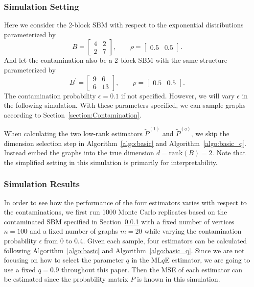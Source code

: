 \documentclass[a4paper]{article}
\begin{document}
\subsubsection{Simulation Setting}
\label{section:sim_setting}
Here we consider the 2-block SBM with respect to the exponential distributions parameterized by
\begin{equation*}
B = \begin{bmatrix}
4 & 2 \\
2 & 7
\end{bmatrix}
,\qquad \rho = \begin{bmatrix}
0.5 & 0.5
\end{bmatrix}.
\end{equation*}
And let the contamination also be a 2-block SBM with the same structure parameterized by
\begin{equation*}
B^{\prime} = \begin{bmatrix}
9 & 6 \\
6 & 13
\end{bmatrix}
,\qquad \rho = \begin{bmatrix}
0.5 & 0.5
\end{bmatrix}.
\end{equation*}
The contamination probability $\epsilon = 0.1$ if not specified. However, we will vary $\epsilon$ in the following simulation. With these parameters specified, we can sample graphs according to Section~\ref{section:Contamination}.

When calculating the two low-rank estimators $\widetilde{P}^{(1)}$ and $\widetilde{P}^{(q)}$, we skip the dimension selection step in Algorithm~\ref{algo:basic} and Algorithm~\ref{algo:basic_q}. Instead embed the graphs into the true dimension $d = \mathrm{rank}(B) = 2$.
Note that the simplified setting in this simulation is primarily for interpretability.



\subsubsection{Simulation Results}

In order to see how the performance of the four estimators varies with respect to the contaminations, we first run 1000 Monte Carlo replicates based on the contaminated SBM specified in Section~\ref{section:sim_setting} with a fixed number of vertices $n = 100$ and a fixed number of graphs $m = 20$ while varying the contamination probability $\epsilon$ from $0$ to $0.4$.
Given each sample, four estimators can be calculated following Algorithm~\ref{algo:basic} and Algorithm~\ref{algo:basic_q}. Since we are not focusing on how to select the parameter $q$ in the ML$q$E estimator, we are going to use a fixed $q = 0.9$ throughout this paper. Then the MSE of each estimator can be estimated since the probability matrix $P$ is known in this simulation.
\end{document}
